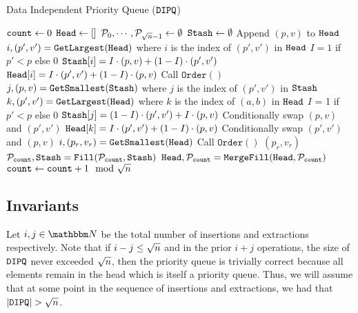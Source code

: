 	
\begin{algorithm}
	\caption{Data Independent Priority Queue ($\texttt{DIPQ}$)}
	\label{alg:DIQueue}
	\begin{algorithmic}[1]
		\Function{$\DIPQInit$}{}
		\State ${\texttt{count}} \gets 0$
		\State $\texttt{Head} \gets []$
		\State $\mathcal{P}_0, \cdots, \mathcal{P}_{{\sqrt{n}}-1} \gets \emptyset$
		\State $\texttt{Stash} \gets \emptyset$
		\EndFunction
		\If{$|\DIPQhead| < \sqrtn$}
			\State Append $(p, v)$ to $\texttt{Head}$
		\Else
			\State $i, (p', v') = \texttt{GetLargest}(\texttt{Head})$ where $i$ is the index of $(p', v')$ in $\texttt{Head}$
			\label{algline:HeadExtract}
			\State $I = 1$ if $p' < p$ else $0$
			\State $\texttt{Stash}[i] = I \cdot (p, v) + (1 - I) \cdot (p', v')$
			\State $\texttt{Head}[i] = I \cdot (p', v') + (1 - I) \cdot (p, v)$
		\EndIf
		\State Call $\texttt{Order}()$ \label{algline:PQOrderIns}
		\EndFunction
		\Function{$\DIPQExtract$}{}
		 	\State $j, (p, v) = \texttt{GetSmallest}(\texttt{Stash})$ where $j$ is the index of $(p', v')$ in $\texttt{Stash}$
		 	\State $k, (p', v') = \texttt{GetLargest}(\texttt{Head})$ where $k$ is the index of $(a, b)$ in $\texttt{Head}$
			\State $I$ = 1 if $p' < p$ else 0
			\State $\texttt{Stash}[j] = (1 - I) \cdot (p', v') + I \cdot (p, v)$ \Comment Conditionally swap $(p, v)$ and $(p', v')$
			\State $\texttt{Head}[k] = I \cdot (p', v') + (1 - I) \cdot (p, v)$ \Comment Conditionally swap $(p', v')$ and $(p, v)$
			\State $i, (p_r, v_r) = \texttt{GetSmallest}(\texttt{Head})$
			\State Call $\texttt{Order}()$
			\State \Return $(p_r, v_r)$
		\EndFunction
		\Function{$\DIPQOrder$}{}
			\State $\mathcal{P}_{{\texttt{count}}}, \texttt{Stash} = \texttt{Fill}(\mathcal{P}_{\texttt{count}}, \texttt{Stash})$
			\State $\texttt{Head}, \mathcal{P}_{\texttt{count}} = \texttt{MergeFill}(\texttt{Head}, \mathcal{P}_{\texttt{count}})$
			\State ${\texttt{count}} \gets {\texttt{count}} + 1 \mod {{\sqrt{n}}}$
		\EndFunction
	\end{algorithmic}
\end{algorithm}


\subsection{Invariants}
\label{subsec:invariants}
Let $i, j \in \N$ be the total number of insertions and extractions respectively. Note that if $i - j \leq {\sqrt{n}}$
and in the prior $i + j$ operations, the size of $\texttt{DIPQ}$ never exceeded ${\sqrt{n}}$, then the priority queue is trivially correct because all elements remain in the head which is itself a priority queue.
Thus, we will assume that at some point in the sequence of insertions and extractions, we had that $|\texttt{DIPQ}| > {\sqrt{n}}$.

